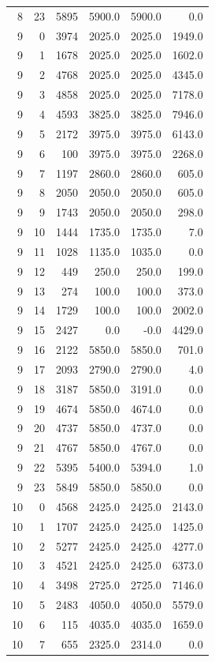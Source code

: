 \begin{longtable}{rrrrrr}
8 & 23 & 5895 & 5900.0 & 5900.0 & 0.0\\
9 & 0 & 3974 & 2025.0 & 2025.0 & 1949.0\\
9 & 1 & 1678 & 2025.0 & 2025.0 & 1602.0\\
9 & 2 & 4768 & 2025.0 & 2025.0 & 4345.0\\
9 & 3 & 4858 & 2025.0 & 2025.0 & 7178.0\\
9 & 4 & 4593 & 3825.0 & 3825.0 & 7946.0\\
9 & 5 & 2172 & 3975.0 & 3975.0 & 6143.0\\
9 & 6 & 100 & 3975.0 & 3975.0 & 2268.0\\
9 & 7 & 1197 & 2860.0 & 2860.0 & 605.0\\
9 & 8 & 2050 & 2050.0 & 2050.0 & 605.0\\
9 & 9 & 1743 & 2050.0 & 2050.0 & 298.0\\
9 & 10 & 1444 & 1735.0 & 1735.0 & 7.0\\
9 & 11 & 1028 & 1135.0 & 1035.0 & 0.0\\
9 & 12 & 449 & 250.0 & 250.0 & 199.0\\
9 & 13 & 274 & 100.0 & 100.0 & 373.0\\
9 & 14 & 1729 & 100.0 & 100.0 & 2002.0\\
9 & 15 & 2427 & 0.0 & -0.0 & 4429.0\\
9 & 16 & 2122 & 5850.0 & 5850.0 & 701.0\\
9 & 17 & 2093 & 2790.0 & 2790.0 & 4.0\\
9 & 18 & 3187 & 5850.0 & 3191.0 & 0.0\\
9 & 19 & 4674 & 5850.0 & 4674.0 & 0.0\\
9 & 20 & 4737 & 5850.0 & 4737.0 & 0.0\\
9 & 21 & 4767 & 5850.0 & 4767.0 & 0.0\\
9 & 22 & 5395 & 5400.0 & 5394.0 & 1.0\\
9 & 23 & 5849 & 5850.0 & 5850.0 & 0.0\\
10 & 0 & 4568 & 2425.0 & 2425.0 & 2143.0\\
10 & 1 & 1707 & 2425.0 & 2425.0 & 1425.0\\
10 & 2 & 5277 & 2425.0 & 2425.0 & 4277.0\\
10 & 3 & 4521 & 2425.0 & 2425.0 & 6373.0\\
10 & 4 & 3498 & 2725.0 & 2725.0 & 7146.0\\
10 & 5 & 2483 & 4050.0 & 4050.0 & 5579.0\\
10 & 6 & 115 & 4035.0 & 4035.0 & 1659.0\\
10 & 7 & 655 & 2325.0 & 2314.0 & 0.0\\

\end{longtable}
